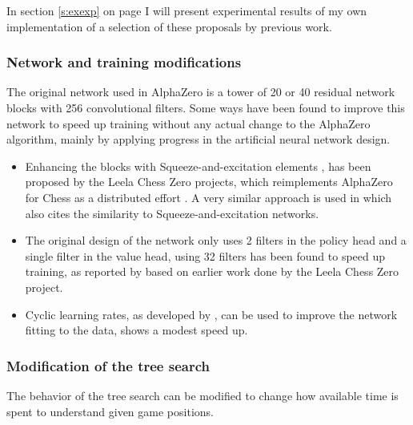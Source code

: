 \documentclass[12pt,onecolumn,oneside,titlepage]{article}
\begin{document}
In section \ref{s:exexp} on page \pageref{s:exexp} I will present experimental results of my own implementation of a selection of these proposals by previous work.

\subsubsection{Network and training modifications}

The original network used in AlphaZero is a tower of 20 or 40 residual network blocks with 256 convolutional filters. Some ways have been found to improve this network to speed up training without any actual change to the AlphaZero algorithm, mainly by applying progress in the artificial neural network design.

\begin{itemize}
 \item Enhancing the blocks with Squeeze-and-excitation elements \cite{hu2018squeeze}, has been proposed by the Leela Chess Zero projects, which reimplements AlphaZero for Chess as a distributed effort \cite{leela0sq}.
       A very similar approach is used in \cite{wu2019accelerating} which also cites the similarity to Squeeze-and-excitation networks.
 \item The original design of the network only uses 2 filters in the policy head and a single filter in the value head, using 32 filters has been found to speed up training, as reported by \cite{oracledevs6} based on earlier work done by the Leela Chess Zero project.
 \item Cyclic learning rates, as developed by \cite{smith2017cyclical}, can be used to improve the network fitting to the data, \cite{oracledevs6} shows a modest speed up.
\end{itemize}

\subsubsection{Modification of the tree search}

The behavior of the tree search can be modified to change how available time is spent to understand given game positions.
\end{document}
